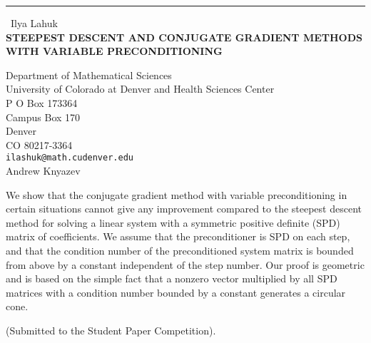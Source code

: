 \documentclass{report}
\begin{document}
\begin{center}
\rule{6in}{1pt} \
{\large Ilya Lahuk \\
{\bf STEEPEST DESCENT AND CONJUGATE GRADIENT METHODS WITH VARIABLE PRECONDITIONING}}

Department of Mathematical Sciences \\ University of Colorado at Denver and Health Sciences Center \\ P O Box 173364 \\ Campus Box 170 \\ Denver \\ CO 80217-3364
\\
{\tt ilashuk@math.cudenver.edu}\\
Andrew Knyazev\end{center}

We show that the conjugate gradient method with variable preconditioning
in certain situations cannot give any improvement compared to the
steepest descent method for solving a
linear system with a symmetric positive definite (SPD) matrix of
coefficients. We assume that the
preconditioner is SPD on each step, and that the condition number of the
preconditioned system
matrix is bounded from above by a constant independent of the step
number. Our proof is geometric
and is based on the simple fact that a nonzero vector multiplied by all
SPD matrices with a condition
number bounded by a constant generates a circular cone.

(Submitted to the Student Paper Competition).
\end{document}

